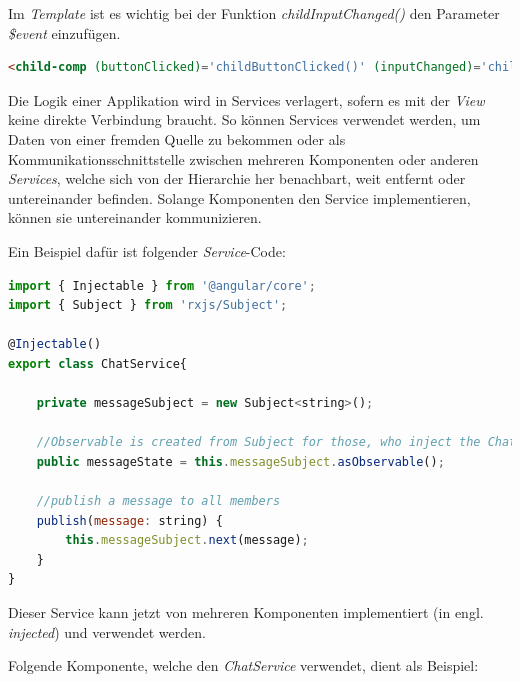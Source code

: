 \begin{itemize}
Im \textit{Template} ist es wichtig bei der Funktion \textit{childInputChanged()} den Parameter \textit{\$event} einzufügen.

\lstset{escapechar=?,style=customjava}
\begin{lstlisting}[language=html, caption=Beispiel von \textit{event binding} (\textit{parent.component.html} - Datei), captionpos=t]
<child-comp (buttonClicked)='childButtonClicked()' (inputChanged)='childInputChanged($event)'></child-comp>
\end{lstlisting}
\lstset{escapechar=@,style=customjava}

\end{itemize}

\clearpage
{}
Die Logik einer Applikation wird in Services verlagert, sofern es mit der \textit{View} keine direkte Verbindung braucht. So können Services verwendet werden, um Daten von einer fremden Quelle zu bekommen oder als Kommunikationsschnittstelle zwischen mehreren Komponenten oder anderen \textit{Services}, welche sich von der Hierarchie her benachbart, weit entfernt oder untereinander befinden. Solange Komponenten den Service implementieren, können sie untereinander kommunizieren.

Ein Beispiel dafür ist folgender \textit{Service}-Code:

\lstset{escapechar=?,style=customjava}
\begin{lstlisting}[language=javascript, caption=Beispiel von einem Service - (\textit{chat.service.ts} - Datei)]
import { Injectable } from '@angular/core';
import { Subject } from 'rxjs/Subject';

@Injectable()
export class ChatService{
    
    private messageSubject = new Subject<string>();
    
    //Observable is created from Subject for those, who inject the ChatService
    public messageState = this.messageSubject.asObservable();
    
    //publish a message to all members
    publish(message: string) {
        this.messageSubject.next(message);
    }
}
\end{lstlisting}
\lstset{escapechar=@,style=customjava}

Dieser Service kann jetzt von mehreren Komponenten implementiert (in engl. \textit{injected}) und verwendet werden. 

\clearpage
Folgende Komponente, welche den \textit{ChatService} verwendet,  dient als Beispiel:

